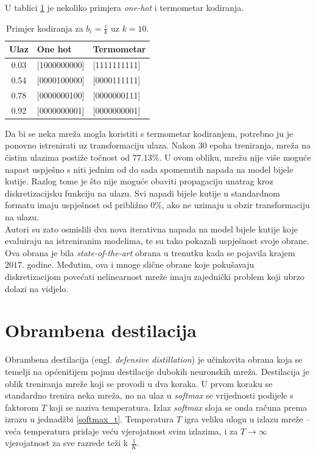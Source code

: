 \documentclass[utf8, diplomski]{fer}
\begin{document}
U tablici \ref{example_encoding} je nekoliko primjera \textit{one-hot} i termometar kodiranja.
\begin{table}[H]
\centering
\begin{tabular}{@{}cll@{}}
\toprule
Ulaz & One hot & Termometar\\ \midrule
0.03 & [1000000000] & [1111111111] \\
0.54 & [0000100000] & [0000111111] \\ 
0.78 & [0000000100] & [0000000111] \\ 
0.92 & [0000000001] & [0000000001] \\ \bottomrule
\end{tabular}
\caption{Primjer kodiranja za $b_{i} = \frac{i}{k}$ uz $k = 10$.}\label{example_encoding}
\end{table}
\par
Da bi se neka mreža mogla koristiti s termometar kodiranjem, potrebno ju je ponovno istrenirati uz transformaciju ulaza. Nakon $30$ epoha treniranja, mreža na čistim ulazima postiže točnost od $77.13\%$. U ovom obliku, mrežu nije više moguće napast uspješno s niti jednim od do sada spomenutih napada na model bijele kutije. Razlog tome je što nije moguće obaviti propagaciju unatrag kroz diskretizacijsku funkciju na ulazu. Svi napadi bijele kutije u standardnom formatu imaju uspješnost od približno $0\%$, ako ne uzimaju u obzir transformaciju na ulazu. \\
Autori su zato osmislili dva nova iterativna napada na model bijele kutije koje evaluiraju na istreniranim modelima, te su tako pokazali uspješnost svoje obrane. Ova obrana je bila \textit{state-of-the-art} obrana u trenutku kada se pojavila krajem $2017.$ godine. Međutim, ova i mnoge slične obrane koje pokušavaju diskretizacijom povećati nelinearnost mreže imaju zajednički problem koji ubrzo dolazi na vidjelo.

\section{Obrambena destilacija}
Obrambena destilacija (engl. \textit{defensive distillation}) je učinkovita obrana koja se temelji na općenitijem pojmu destilacije dubokih neuronskih mreža. Destilacija je oblik treniranja mreže koji se provodi u dva koraka. U prvom koraku se standardno trenira neka mreža, no na ulaz u \textit{softmax} se vrijednosti podijele s faktorom $T$ koji se naziva temperatura. Izlaz \textit{softmax} sloja se onda računa prema izrazu u jednadžbi \ref{softmax_t}. Temperatura $T$ igra veliku ulogu u izlazu mreže -- veća temperatura pridaje veću vjerojatnost svim izlazima, i za $T \rightarrow \infty$ vjerojatnost za sve razrede teži k $\frac{1}{K}$. \par
\end{document}
